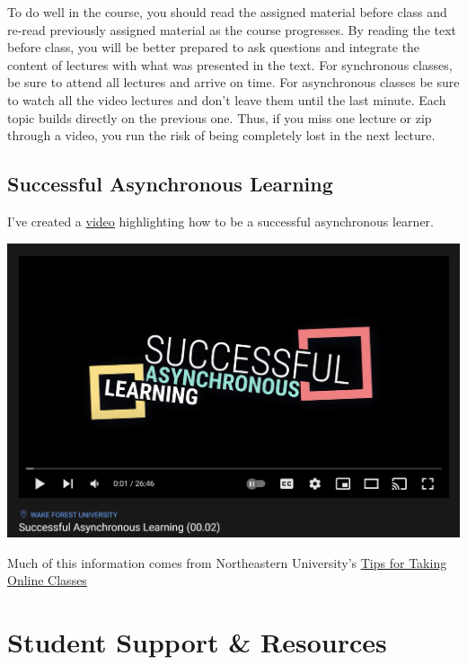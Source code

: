 \documentclass[
]{book}
\begin{document}
To do well in the course, you should read the assigned material before class and re-read previously assigned material as the course progresses.
By reading the text before class, you will be better prepared to ask questions and integrate the content of lectures with what was presented in the text.
For synchronous classes, be sure to attend all lectures and arrive on time.
For asynchronous classes be sure to watch all the video lectures and don't leave them until the last minute. Each topic builds directly on the previous one.
Thus, if you miss one lecture or zip through a video, you run the risk of being completely lost in the next lecture.

\hypertarget{successful-asynchronous-learning}{%
\section{Successful Asynchronous Learning}\label{successful-asynchronous-learning}}

I've created a \href{https://youtu.be/dc3D2tbl8G0}{video} highlighting how to be a successful asynchronous learner.

\includegraphics[width=30.76in]{img/learngood}

Much of this information comes from Northeastern University's \href{https://www.northeastern.edu/graduate/blog/tips-for-taking-online-classes/}{Tips for Taking Online Classes}

\hypertarget{student-support-resources}{%
\chapter{Student Support \& Resources}\label{student-support-resources}}
\end{document}
